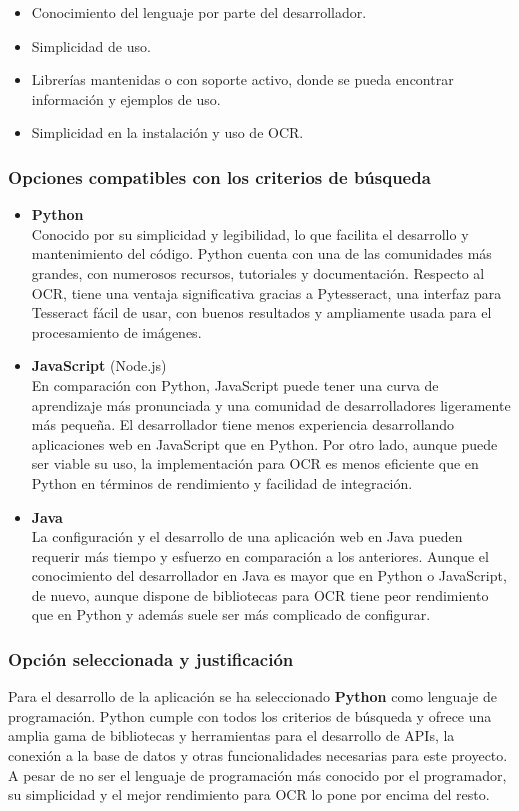 \begin{itemize}
    \item Conocimiento del lenguaje por parte del desarrollador.
    \item Simplicidad de uso.
    \item Librerías mantenidas o con soporte activo, donde se pueda encontrar información y ejemplos de uso.
    \item Simplicidad en la instalación y uso de OCR.
\end{itemize}

\subsubsection{Opciones compatibles con los criterios de búsqueda}
\begin{itemize}
    \item \textbf{Python}\\
        Conocido por su simplicidad y legibilidad, lo que facilita el desarrollo y mantenimiento del código. Python cuenta con una de las comunidades más grandes, con numerosos recursos, tutoriales y documentación. Respecto al OCR, tiene una ventaja significativa gracias a Pytesseract, una interfaz para Tesseract fácil de usar, con buenos resultados y ampliamente usada para el procesamiento de imágenes. 
    \item \textbf{JavaScript} (Node.js)\\
        En comparación con Python, JavaScript puede tener una curva de aprendizaje más pronunciada y una comunidad de desarrolladores ligeramente más pequeña. El desarrollador tiene menos experiencia desarrollando aplicaciones web en JavaScript que en Python. Por otro lado, aunque puede ser viable su uso, la implementación para OCR es menos eficiente que en Python en términos de rendimiento y facilidad de integración.
    \item \textbf{Java}\\
        La configuración y el desarrollo de una aplicación web en Java pueden requerir más tiempo y esfuerzo en comparación a los anteriores. Aunque el conocimiento del desarrollador en Java es mayor que en Python o JavaScript, de nuevo, aunque dispone de bibliotecas para OCR tiene peor rendimiento que en Python y además suele ser más complicado de configurar.
\end{itemize}

\subsubsection{Opción seleccionada y justificación}
Para el desarrollo de la aplicación se ha seleccionado \textbf{Python} como lenguaje de programación. Python cumple con todos los criterios de búsqueda y ofrece una amplia gama de bibliotecas y herramientas para el desarrollo de APIs, la conexión a la base de datos y otras funcionalidades necesarias para este proyecto. A pesar de no ser el lenguaje de programación más conocido por el programador, su simplicidad y el mejor rendimiento para OCR lo pone por encima del resto.

